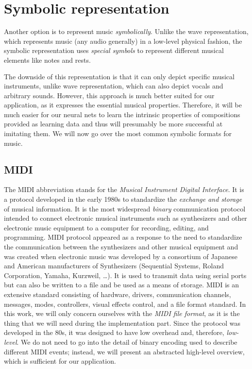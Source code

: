 \section{Symbolic representation}\label{sec:symbolic-representation}

Another option is to represent music \textit{symbolically}.
Unlike the wave representation, which represents music (any audio generally) in a low-level physical fashion, the symbolic representation uses \textit{special symbols} to represent different musical elements like notes and rests.

The downside of this representation is that it can only depict specific musical instruments, unlike wave representation, which can also depict vocals and arbitrary sounds.
However, this approach is much better suited for our application, as it expresses the essential musical properties.
Therefore, it will be much easier for our neural nets to learn the intrinsic properties of compositions provided as learning data and thus will presumably be more successful at imitating them.
We will now go over the most common symbolic formats for music.

\subsection{MIDI}\label{subsec:midi}

The MIDI abbreviation stands for the \textit{Musical Instrument Digital Interface}.
It is a protocol developed in the early 1980s to standardize the \textit{exchange and storage} of musical information.
It is the most widespread \textit{binary} communication protocol intended to connect electronic musical instruments such as synthesizers and other electronic music equipment to a computer for recording, editing, and programming.
MIDI protocol appeared as a response to the need to standardize the communication between the synthesizers and other musical equipment and was created when electronic music was developed by a consortium of Japanese and American manufacturers of Synthesizers (Sequential Systems, Roland Corporation, Yamaha, Kurzweil, \ldots).
It is used to transmit data using serial ports but can also be written to a file and be used as a means of storage.
MIDI is an extensive standard consisting of hardware, drivers, communication channels, messages, modes, controllers, visual effects control, and a file format standard.
In this work, we will only concern ourselves with the \textit{MIDI file format}, as it is the thing that we will need during the implementation part.
Since the protocol was developed in the 80s, it was designed to have low overhead and, therefore, \textit{low-level}.
We do not need to go into the detail of binary encoding used to describe different MIDI events;
instead, we will present an abstracted high-level overview, which is sufficient for our application.~\cite{understanding-midi}

